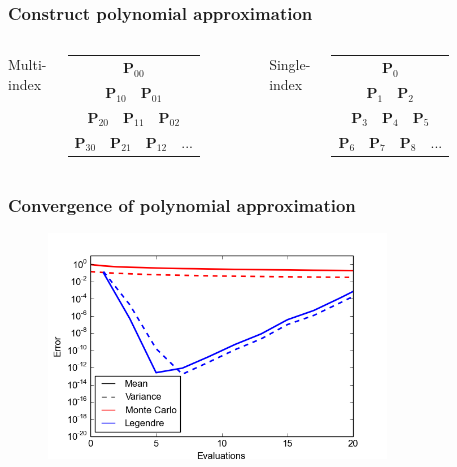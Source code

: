 \documentclass{beamer}
\begin{document}
\begin{frame}
  \frametitle{Construct polynomial approximation}
  \begin{columns}[c] 
      Multi-index\\
    \begin{tabular}{c}
    \\
      $\mathbf{P}_{00}$\\
    $\mathbf{P}_{10} \quad \mathbf{P}_{01}$\\
    $\mathbf{P}_{20} \quad \mathbf{P}_{11}\quad \mathbf{P}_{02}$\\
    $\mathbf{P}_{30} \quad \mathbf{P}_{21}\quad \mathbf{P}_{12}\quad ...$ 
  \end{tabular}


Single-index\\
\begin{tabular}{c}
\\
    $\mathbf{P}_{0}$\\
    $\mathbf{P}_{1} \quad \mathbf{P}_{2}$\\
    $\mathbf{P}_{3} \quad \mathbf{P}_{4}\quad \mathbf{P}_{5}$\\
    $\mathbf{P}_{6} \quad \mathbf{P}_{7}\quad \mathbf{P}_{8}\quad ...$ 
  \end{tabular}
  \end{columns}
\end{frame}

\begin{frame}
  \frametitle{Convergence of polynomial approximation}

  \begin{figure}
    \includegraphics[width=0.8\textwidth]{MC_convergence_1D_2.png}
  \end{figure}
  
\end{frame}
\end{document}
